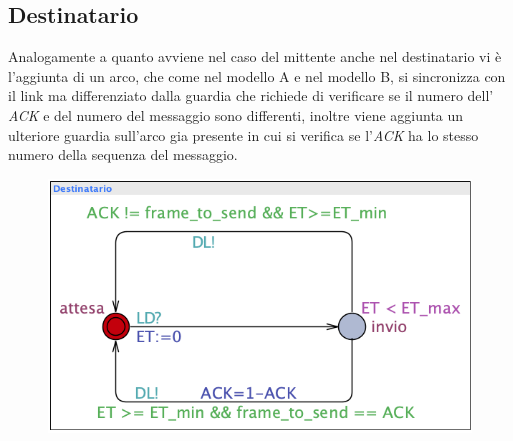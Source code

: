 \documentclass{article}
\begin{document}
\subsection{Destinatario}
Analogamente a quanto avviene nel caso del mittente anche nel destinatario vi è l'aggiunta di un arco, che come nel modello A e nel modello B, si sincronizza con il link ma differenziato dalla guardia che richiede di verificare se il numero dell' \textit{ACK} e del numero del messaggio sono differenti, inoltre viene aggiunta un ulteriore guardia sull'arco gia presente in cui si verifica se l'\textit{ACK} ha lo stesso numero della sequenza del messaggio.
\begin{figure}[h] 
\centering
\includegraphics[scale=0.5]{modelloCD.png}
\end{figure}
\end{document}
